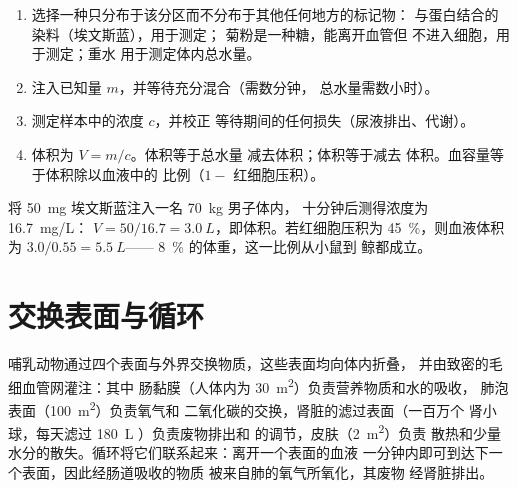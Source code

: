 \begin{method}[用稀释法测量体液分区]\label{met:b1:mammal-organization:dilution}
\begin{enumerate}
  \item 选择一种只分布于该分区而不分布于其他任何地方的标记物：
        与蛋白结合的染料（埃文斯蓝），用于测定；
        菊粉是一种糖，能离开血管但
        不进入细胞，用于测定；重水
        用于测定体内总水量。
  \item 注入已知量 $m$，并等待充分混合（需数分钟，
        总水量需数小时）。
  \item 测定样本中的浓度 $c$，并校正
        等待期间的任何损失（尿液排出、代谢）。
  \item 体积为 $V = m/c$。体积等于总水量
        减去体积；体积等于减去
        体积。血容量等于体积除以血液中的
        比例（$1 - $ 红细胞压积）。
\end{enumerate}
\end{method}

\begin{example}[血浆体积]\label{ex:b1:mammal-organization:evansblue}
将 \qty{50}{mg} 埃文斯蓝注入一名 \qty{70}{kg} 男子体内，
十分钟后测得浓度为 \qty{16.7}{mg/L}：
$V = 50/16.7 = \qty{3.0}{L}$，即体积。若红细胞压积为
\qty{45}{\%}，则血液体积为 $3.0/0.55 = \qty{5.5}{L}$——
\qty{8}{\%} 的体重，这一比例从小鼠到
鲸都成立。
\end{example}

\section{交换表面与循环}

\begin{proposition}[每个交换表面都与血液相连]\label{prop:b1:mammal-organization:surfaces}
哺乳动物通过四个表面与外界交换物质，这些表面均向体内折叠，
并由致密的毛细血管网灌注：其中
肠黏膜（人体内为 \qty{30}{m^2}）负责营养物质和水的吸收，
肺泡表面（\qty{100}{m^2}）负责氧气和
二氧化碳的交换，肾脏的滤过表面（一百万个
肾小球，每天滤过 \qty{180}{L} ）负责废物排出和
的调节，皮肤（\qty{2}{m^2}）负责
散热和少量水分的散失。循环将它们联系起来：离开一个表面的血液
一分钟内即可到达下一个表面，因此经肠道吸收的物质
被来自肺的氧气所氧化，其废物
经肾脏排出。
\end{proposition}

